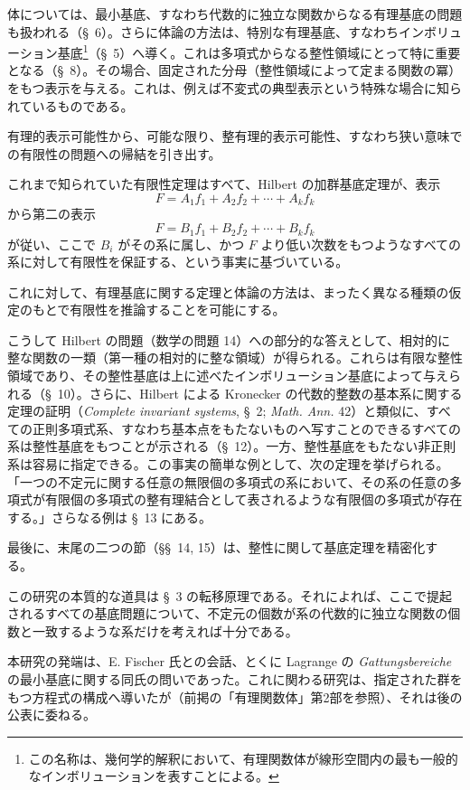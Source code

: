\documentclass[11pt]{jlreq}
\begin{document}
体については、最小基底、すなわち代数的に独立な関数からなる有理基底の問題も扱われる（\S\ 6）。さらに体論の方法は、特別な有理基底、すなわちインボリューション基底\footnote{この名称は、幾何学的解釈において、有理関数体が線形空間内の最も一般的なインボリューションを表すことによる。}（\S\ 5）へ導く。これは多項式からなる整性領域にとって特に重要となる（\S\ 8）。その場合、固定された分母（整性領域によって定まる関数の冪）をもつ表示を与える。これは、例えば不変式の典型表示という特殊な場合に知られているものである。

有理的表示可能性から、可能な限り、整有理的表示可能性、すなわち狭い意味での有限性の問題への帰結を引き出す。

これまで知られていた有限性定理はすべて、Hilbert の加群基底定理が、表示
\[
  F=A_1f_1+A_2f_2+\cdots+A_kf_k
\]
から第二の表示
\[
  F=B_1f_1+B_2f_2+\cdots+B_kf_k
\]
が従い、ここで $B_i$ がその系に属し、かつ $F$ より低い次数をもつようなすべての系に対して有限性を保証する、という事実に基づいている。

これに対して、有理基底に関する定理と体論の方法は、まったく異なる種類の仮定のもとで有限性を推論することを可能にする。

こうして Hilbert の問題（数学の問題 14）への部分的な答えとして、相対的に整な関数の一類（第一種の相対的に整な領域）が得られる。これらは有限な整性領域であり、その整性基底は上に述べたインボリューション基底によって与えられる（\S\ 10）。さらに、Hilbert による Kronecker の代数的整数の基本系に関する定理の証明（\emph{Complete invariant systems}, \S\ 2; \emph{Math. Ann.} 42）と類似に、すべての正則多項式系、すなわち基本点をもたないものへ写すことのできるすべての系は整性基底をもつことが示される（\S\ 12）。一方、整性基底をもたない非正則系は容易に指定できる。この事実の簡単な例として、次の定理を挙げられる。「一つの不定元に関する任意の無限個の多項式の系において、その系の任意の多項式が有限個の多項式の整有理結合として表されるような有限個の多項式が存在する。」さらなる例は \S\ 13 にある。

最後に、末尾の二つの節（\S\S\ 14, 15）は、整性に関して基底定理を精密化する。

この研究の本質的な道具は \S\ 3 の転移原理である。それによれば、ここで提起されるすべての基底問題について、不定元の個数が系の代数的に独立な関数の個数と一致するような系だけを考えれば十分である。

本研究の発端は、E. Fischer 氏との会話、とくに Lagrange の \emph{Gattungsbereiche} の最小基底に関する同氏の問いであった。これに関わる研究は、指定された群をもつ方程式の構成へ導いたが（前掲の「有理関数体」第2部を参照）、それは後の公表に委ねる。
\end{document}
